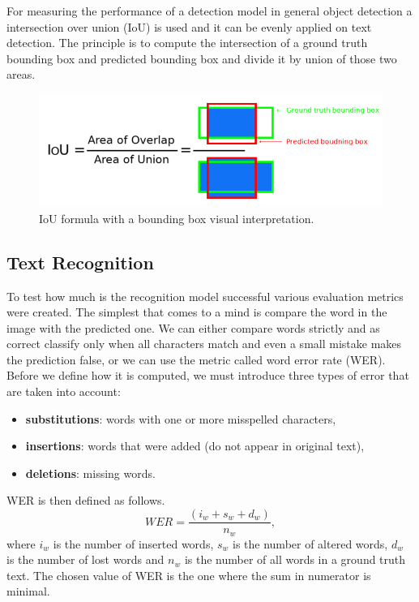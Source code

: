 For measuring the performance of a detection model in general object detection a intersection over union (IoU) is used and it can be evenly applied on text detection. The principle is to compute the intersection of a ground truth bounding box and predicted bounding box and divide it by union of those two areas.\cite{pyimage_iou}

\begin{figure}[hbtp]
    \centering
    \includegraphics[scale=0.4]{obrazky/iou_equation.png}
    \caption{IoU formula with a bounding box visual interpretation.}
    \label{Im:iou}
\end{figure}

\subsection*{Text Recognition}
To test how much is the recognition model successful various evaluation metrics were created. The simplest that comes to a mind is compare the word in the image with the predicted one. We can either compare words strictly and as correct classify only when all characters match and even a small mistake makes the prediction false, or we can use  the metric called word error rate (WER). Before we define how it is computed, we must introduce three types of error that are taken into account:
\begin{itemize}
    \item \textbf{substitutions}: words with one or more misspelled characters,
    \item \textbf{insertions}: words that were added (do not appear in original text),
    \item \textbf{deletions}: missing words.
\end{itemize}

WER is then defined as follows.
\begin{equation}
    WER = \frac{(i_w + s_w + d_w)}{n_w},
\end{equation}
where $i_w$ is the number of inserted words, $s_w$ is the number of altered words, $d_w$ is the number of lost words and $n_w$ is the number of all words in a ground truth text. The chosen value of WER is the one where the sum in numerator is minimal.\cite{cersite}

